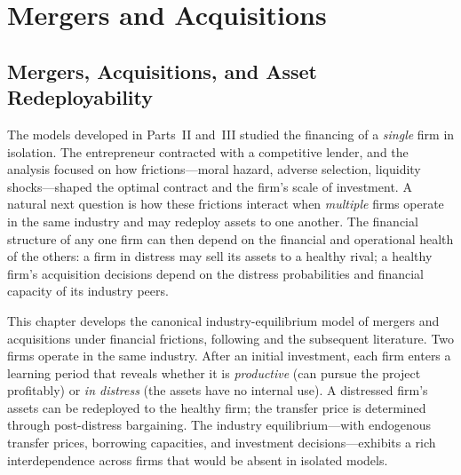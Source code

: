 \documentclass[11pt,a4paper,oneside]{book}
\theoremstyle{plain}
\theoremstyle{definition}
\theoremstyle{remark}
\numberwithin{equation}{chapter}
\begin{document}

\part{Mergers and Acquisitions}


\chapter{Mergers, Acquisitions, and Asset Redeployability}
\label{ch:ma}

The models developed in Parts~II and~III studied the financing of a \emph{single} firm in isolation.
The entrepreneur contracted with a competitive lender, and the analysis focused on how frictions---moral hazard, adverse selection, liquidity shocks---shaped the optimal contract and the firm's scale of investment.
A natural next question is how these frictions interact when \emph{multiple} firms operate in the same industry and may redeploy assets to one another.
The financial structure of any one firm can then depend on the financial and operational health of the others: a firm in distress may sell its assets to a healthy rival; a healthy firm's acquisition decisions depend on the distress probabilities and financial capacity of its industry peers.

This chapter develops the canonical industry-equilibrium model of mergers and acquisitions under financial frictions, following \citet{ShleiferVishny1992} and the subsequent literature.
Two firms operate in the same industry.
After an initial investment, each firm enters a learning period that reveals whether it is \emph{productive} (can pursue the project profitably) or \emph{in distress} (the assets have no internal use).
A distressed firm's assets can be redeployed to the healthy firm; the transfer price is determined through post-distress bargaining.
The industry equilibrium---with endogenous transfer prices, borrowing capacities, and investment decisions---exhibits a rich interdependence across firms that would be absent in isolated models.
\end{document}
